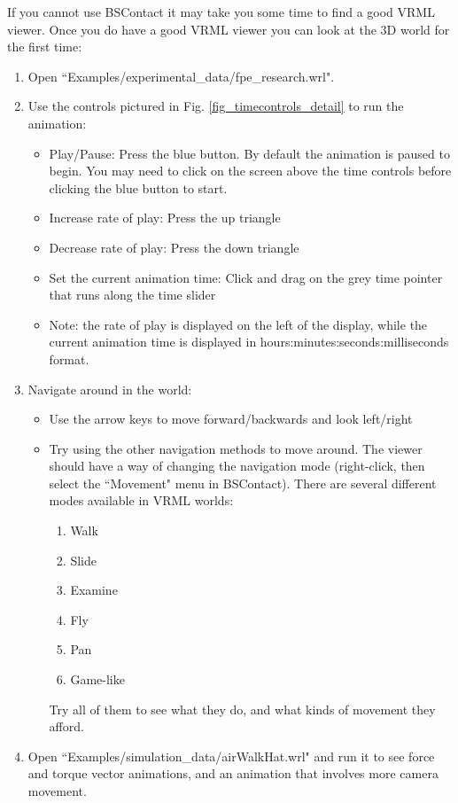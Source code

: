 \documentclass[singlecolumn,12pt]{article}
\begin{document}
If you cannot use BSContact it may take you some time to find a good
VRML viewer. Once you do have a good VRML viewer you can look at the
3D world for the first time:

\begin{enumerate}
\item Open ``Examples/experimental\_data/fpe\_research.wrl".
\item Use the controls pictured in Fig.
\ref{fig_timecontrols_detail} to run the animation:

\begin{itemize}
\item Play/Pause: Press the blue button. By default the animation is
paused to begin. You may need to click on the screen above the time
controls before clicking the blue button to start.
\item Increase rate of play: Press the up triangle
\item Decrease rate of play: Press the down triangle
\item Set the current animation time: Click and drag on the grey
time pointer that runs along the time slider
\item Note: the rate of play is displayed on the left of the
display, while the current animation time is displayed in
hours:minutes:seconds:milliseconds format.
\end{itemize}

\item Navigate around in the world:

\begin{itemize}
\item Use the arrow keys to move forward/backwards and look
left/right
\item Try using the other navigation methods to move around. The
viewer should have a way of changing the navigation mode
(right-click, then select the ``Movement" menu in BSContact). There
are several different modes available in VRML worlds:

\begin{enumerate}
\item Walk
\item Slide
\item Examine
\item Fly
\item Pan
\item Game-like
\end{enumerate}

Try all of them to see what they do, and what kinds of movement they
afford.

\end{itemize}

\item Open ``Examples/simulation\_data/airWalkHat.wrl" and run it to
see force and torque vector animations, and an animation that
involves more camera movement.

\end{enumerate}
\end{document}
